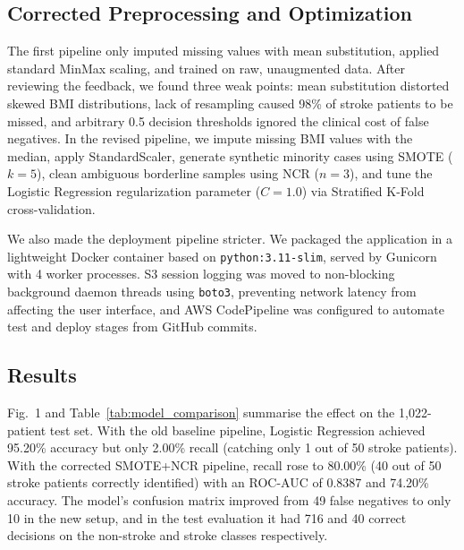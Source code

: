 \documentclass[10pt,journal,compsoc]{IEEEtran}
\begin{document}
\subsection{Corrected Preprocessing and Optimization}
The first pipeline only imputed missing values with mean substitution, applied standard MinMax scaling, and trained on raw, unaugmented data. After reviewing the feedback, we found three weak points: mean substitution distorted skewed BMI distributions, lack of resampling caused 98\% of stroke patients to be missed, and arbitrary 0.5 decision thresholds ignored the clinical cost of false negatives. In the revised pipeline, we impute missing BMI values with the median, apply StandardScaler, generate synthetic minority cases using SMOTE ($k=5$), clean ambiguous borderline samples using NCR ($n=3$), and tune the Logistic Regression regularization parameter ($C=1.0$) via Stratified K-Fold cross-validation.

We also made the deployment pipeline stricter. We packaged the application in a lightweight Docker container based on \texttt{python:3.11-slim}, served by Gunicorn with 4 worker processes. S3 session logging was moved to non-blocking background daemon threads using \texttt{boto3}, preventing network latency from affecting the user interface, and AWS CodePipeline was configured to automate test and deploy stages from GitHub commits.

\subsection{Results}
Fig.~1 and Table~\ref{tab:model_comparison} summarise the effect on the 1,022-patient test set. With the old baseline pipeline, Logistic Regression achieved 95.20\% accuracy but only 2.00\% recall (catching only 1 out of 50 stroke patients). With the corrected SMOTE+NCR pipeline, recall rose to 80.00\% (40 out of 50 stroke patients correctly identified) with an ROC-AUC of 0.8387 and 74.20\% accuracy. The model's confusion matrix improved from 49 false negatives to only 10 in the new setup, and in the test evaluation it had 716 and 40 correct decisions on the non-stroke and stroke classes respectively.
\end{document}
